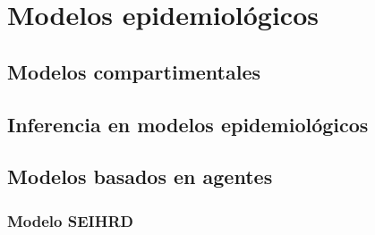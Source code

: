 \chapter{Modelos epidemiológicos}
\section{Modelos compartimentales}
\section{Inferencia en modelos epidemiológicos}
\section{Modelos basados en agentes}
\subsection{Modelo SEIHRD}
